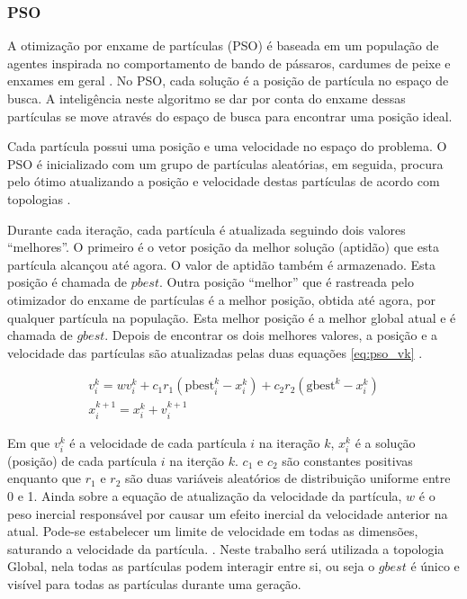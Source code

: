 \subsubsection{PSO}
\label{subsec:pso}

A otimização por enxame de partículas (PSO) é baseada em um população de agentes inspirada no comportamento de bando de pássaros, cardumes de peixe e enxames em geral \cite{kennedy1995particle}. No PSO, cada solução é a posição de partícula no espaço de busca. A inteligência neste algoritmo se dar por conta do enxame dessas partículas se move através do espaço de busca para encontrar uma posição ideal. 

Cada partícula possui uma posição e uma velocidade no espaço do problema. O PSO é inicializado com um grupo de partículas aleatórias, em seguida, procura pelo ótimo atualizando a posição e velocidade destas partículas de acordo com topologias \cite{figueiredo2014investigating}.

Durante cada iteração, cada partícula é atualizada seguindo dois valores “melhores”. O primeiro é o vetor posição da melhor solução (aptidão) que esta partícula alcançou até agora. O valor de aptidão também é armazenado. Esta posição é chamada de $pbest$. Outra posição “melhor” que é rastreada pelo otimizador do enxame de partículas é a melhor posição, obtida até agora, por qualquer partícula na população. Esta melhor posição é a melhor global atual e é chamada de $gbest$. Depois de encontrar os dois melhores valores, a posição e a velocidade das partículas são atualizadas pelas duas equações \ref{eq:pso_vk} \cite{jaberipour2011particle}.

\begin{equation}
\label{eq:pso_vk}
    \begin{gathered}
        v_i^k=wv_i^k+c_1r_1{(\mathrm{pbest}_i^k-x_i^k)}+c_2r_2{(\mathrm{gbest}^k-x_i^k)} \\
        x_i^{k+1}=x_i^k+v_i^{k+1}
    \end{gathered}
\end{equation}

Em que $v_i^k$ é a velocidade de cada partícula $i$ na iteração $k$, $x_i^{k}$ é a solução (posição) de cada partícula $i$ na iterção $k$. $c_1$ e $c_2$ são constantes positivas enquanto que $r_1$ e $r_2$ são duas variáveis aleatórios de distribuição uniforme entre 0 e 1. Ainda sobre a equação de atualização da velocidade da partícula,  $w$ é o peso inercial responsável por causar um efeito inercial da velocidade anterior na atual. Pode-se estabelecer um limite de velocidade em todas as dimensões, saturando a velocidade da partícula. \cite{jaberipour2011particle}. Neste trabalho será utilizada a topologia Global, nela todas as partículas podem interagir entre si, ou seja o $gbest$ é único e visível para todas as partículas durante uma geração.


